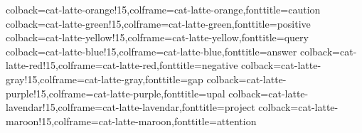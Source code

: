 
%
{colback=cat-latte-orange!15,colframe=cat-latte-orange,fonttitle=\bfseries}{caution}
%
{colback=cat-latte-green!15,colframe=cat-latte-green,fonttitle=\bfseries}{positive}
%
{colback=cat-latte-yellow!15,colframe=cat-latte-yellow,fonttitle=\bfseries}{query}
%
{colback=cat-latte-blue!15,colframe=cat-latte-blue,fonttitle=\bfseries}{answer}
%
{colback=cat-latte-red!15,colframe=cat-latte-red,fonttitle=\bfseries}{negative}
%
{colback=cat-latte-gray!15,colframe=cat-latte-gray,fonttitle=\bfseries}{gap}
%
{colback=cat-latte-purple!15,colframe=cat-latte-purple,fonttitle=\bfseries}{upal}
%
{colback=cat-latte-lavendar!15,colframe=cat-latte-lavendar,fonttitle=\bfseries}{project}
%
{colback=cat-latte-maroon!15,colframe=cat-latte-maroon,fonttitle=\bfseries}{attention}

\newcommand{\hlred}[1]{\sethlcolor{soulred}\hl{#1}}
\newcommand{\hlgreen}[1]{\sethlcolor{soulgreen}\hl{#1}}
\newcommand{\hlyellow}[1]{\sethlcolor{soulyellow}\hl{#1}}
\newcommand{\hlblue}[1]{\sethlcolor{soulblue}\hl{#1}}
\newcommand{\hlorange}[1]{\sethlcolor{soulorange}\hl{#1}}
\newcommand{\hlgray}[1]{\sethlcolor{soulgray}\hl{#1}}

\setul{}{1pt} %
\newcommand{\ulred}[1]{\setulcolor{cat-latte-red}\ul{#1}}
\newcommand{\ulgreen}[1]{\setulcolor{cat-latte-green}\ul{#1}}
\newcommand{\ulyellow}[1]{\setulcolor{cat-latte-yellow}\ul{#1}}
\newcommand{\ulblue}[1]{\setulcolor{cat-latte-blue}\ul{#1}}
\newcommand{\ulorange}[1]{\setulcolor{cat-latte-orange}\ul{#1}}
\newcommand{\ulgray}[1]{\setulcolor{cat-latte-gray}\ul{#1}}




